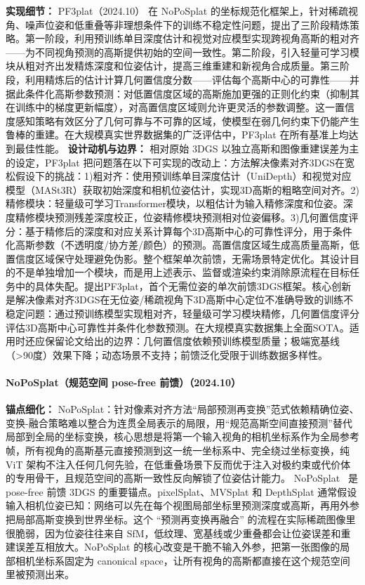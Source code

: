 \textbf{实现细节：} PF3plat（2024.10） 在 NoPoSplat 的坐标规范化框架上，针对稀疏视角、噪声位姿和低重叠等非理想条件下的训练不稳定性问题，提出了三阶段精炼策略。第一阶段，利用预训练单目深度估计和视觉对应模型实现跨视角高斯的粗对齐——为不同视角预测的高斯提供初始的空间一致性。第二阶段，引入轻量可学习模块从粗对齐出发精炼深度和位姿估计，提高三维重建和新视角合成质量。第三阶段，利用精炼后的估计计算几何置信度分数——评估每个高斯中心的可靠性——并据此条件化高斯参数预测：对低置信度区域的高斯施加更强的正则化约束（抑制其在训练中的梯度更新幅度），对高置信度区域则允许更灵活的参数调整。这一置信度感知策略有效区分了几何可靠与不可靠的区域，使模型在弱几何约束下仍能产生鲁棒的重建。在大规模真实世界数据集的广泛评估中，PF3plat 在所有基准上均达到最佳性能。
\textbf{设计动机与边界：} 相对原始 3DGS 以独立高斯和图像重建误差为主的设定，PF3plat 把问题落在以下可实现的改动上：方法解决像素对齐3DGS在宽松假设下的挑战：1)粗对齐：使用预训练单目深度估计（UniDepth）和视觉对应模型（MASt3R）获取初始深度和相机位姿估计，实现3D高斯的粗略空间对齐。2)精修模块：轻量级可学习Transformer模块，以粗估计为输入精修深度和位姿。深度精修模块预测残差深度校正，位姿精修模块预测相对位姿偏移。3)几何置信度评分：基于精修后的深度和对应关系计算每个3D高斯中心的可靠性评分，用于条件化高斯参数（不透明度/协方差/颜色）的预测。高置信度区域生成高质量高斯，低置信度区域保守处理避免伪影。整个框架单次前馈，无需场景特定优化。其设计目的不是单独增加一个模块，而是用上述表示、监督或渲染约束消除原流程在目标任务中的具体失配。提出PF3plat，首个无需位姿的单次前馈3DGS框架。核心创新是解决像素对齐3DGS在无位姿/稀疏视角下3D高斯中心定位不准确导致的训练不稳定问题：通过预训练模型实现粗对齐，轻量级可学习模块精修，几何置信度评分评估3D高斯中心可靠性并条件化参数预测。在大规模真实数据集上全面SOTA。适用时还应保留论文给出的边界：几何置信度依赖预训练模型质量；极端宽基线（>90度）效果下降；动态场景不支持；前馈泛化受限于训练数据多样性。
\paragraph{NoPoSplat（规范空间 pose-free 前馈）（2024.10）}
\textbf{锚点细化：} NoPoSplat：针对像素对齐方法``局部预测再变换''范式依赖精确位姿、变换-融合策略难以整合为连贯全局表示的局限，用``规范高斯空间直接预测''替代局部到全局的坐标变换，核心思想是将第一个输入视角的相机坐标系作为全局参考帧，所有视角的高斯基元直接预测到这一统一坐标系中、完全绕过坐标变换，纯 ViT 架构不注入任何几何先验，在低重叠场景下反而优于注入对极约束或代价体的专用骨干，且规范空间的高斯一致性反向解锁了位姿估计能力。
NoPoSplat~\cite{2410_24207} 是 pose-free 前馈 3DGS 的重要锚点。pixelSplat、MVSplat 和 DepthSplat 通常假设输入相机位姿已知：网络可以先在每个视图局部坐标里预测深度或高斯，再用外参把局部高斯变换到世界坐标。这个 ``预测再变换再融合'' 的流程在实际稀疏图像里很脆弱，因为位姿往往来自 SfM，低纹理、宽基线或少重叠都会让位姿误差和重建误差互相放大。NoPoSplat 的核心改变是干脆不输入外参，把第一张图像的局部相机坐标系固定为 canonical space，让所有视角的高斯都直接在这个规范空间里被预测出来。

